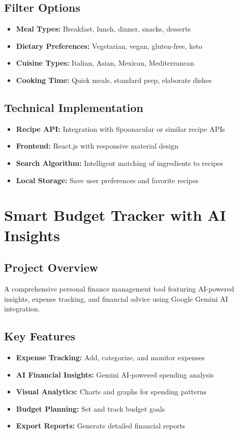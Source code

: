 \documentclass[11pt,a4paper]{article}
\begin{document}
\subsection{Filter Options}
\begin{itemize}[leftmargin=1.5cm]
\item \textbf{Meal Types:} Breakfast, lunch, dinner, snacks, desserts
\item \textbf{Dietary Preferences:} Vegetarian, vegan, gluten-free, keto
\item \textbf{Cuisine Types:} Italian, Asian, Mexican, Mediterranean
\item \textbf{Cooking Time:} Quick meals, standard prep, elaborate dishes
\end{itemize}

\subsection{Technical Implementation}
\begin{itemize}[leftmargin=1.5cm]
\item \textbf{Recipe API:} Integration with Spoonacular or similar recipe APIs
\item \textbf{Frontend:} React.js with responsive material design
\item \textbf{Search Algorithm:} Intelligent matching of ingredients to recipes
\item \textbf{Local Storage:} Save user preferences and favorite recipes
\end{itemize}

\newpage

\section{Smart Budget Tracker with AI Insights}

\subsection{Project Overview}
A comprehensive personal finance management tool featuring AI-powered insights, expense tracking, and financial advice using Google Gemini AI integration.

\subsection{Key Features}
\begin{itemize}[leftmargin=1.5cm]
\item \textbf{Expense Tracking:} Add, categorize, and monitor expenses
\item \textbf{AI Financial Insights:} Gemini AI-powered spending analysis
\item \textbf{Visual Analytics:} Charts and graphs for spending patterns
\item \textbf{Budget Planning:} Set and track budget goals
\item \textbf{Export Reports:} Generate detailed financial reports
\end{itemize}
\end{document}
